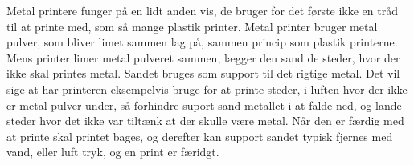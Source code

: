 Metal printere funger på en lidt anden vis, de bruger for det første ikke en tråd til at printe med, som så mange plastik printer. Metal printer bruger metal pulver, som bliver limet sammen lag på, sammen princip som plastik printerne. 
Mens printer limer metal pulveret sammen, lægger den sand de steder, hvor der ikke skal printes metal. Sandet bruges som support til det rigtige metal. Det vil sige at har printeren eksempelvis bruge for at printe steder, i luften hvor der ikke er metal pulver under, så forhindre suport sand metallet i at falde ned, og lande steder hvor det ikke var tiltænk at der skulle være metal.
Når den er færdig med at printe skal printet bages, og derefter kan support sandet typisk fjernes med vand, eller luft tryk, og en print er færidgt.


